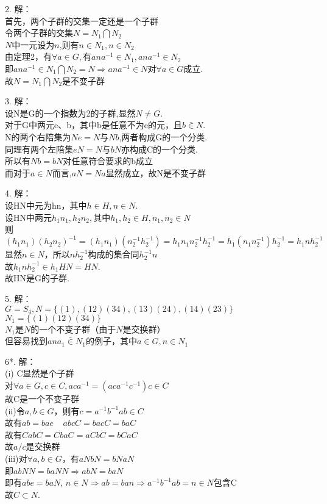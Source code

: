 \documentclass{ctexart}
\begin{document}
2.
解：\\
首先，两个子群的交集一定还是一个子群\\
令两个子群的交集$N=N_1 \bigcap N_2$\\
$N$中一元设为$n$,则有$n \in N_1, n \in N_2$\\
由定理2，有$\forall a \in G,$有$ana^{-1} \in N_1,ana^{-1} \in N_2$\\
即$ana^{-1} \in N_1 \bigcap N_2 = N \Rightarrow ana^{-1} \in N$对$\forall a \in G$成立.\\
故$N=N_1 \bigcap N_2$是不变子群

3.
解：\\
设N是G的一个指数为2的子群,显然$N \neq G.$\\
对于G中两元e、b，其中b是任意不为e的元，且$b \bar{\in} N.$\\
N的两个右陪集为$Ne=N$与$Nb$,两者构成G的一个分类.\\
同理有两个左陪集$eN=N$与$bN$亦构成C的一个分类.\\
所以有$Nb=bN$对任意符合要求的b成立\\
而对于$a\in N$而言,$aN=Na$显然成立，故N是不变子群

4.
解：\\
设HN中元为hn，其中$h \in H, n \in N$.\\
设HN中两元$h_1n_1,h_2n_2,$其中$h_1,h_2 \in H, n_1,n_2 \in N$\\
则$(h_1n_1)(h_2n_2)^{-1}=(h_1n_1)(n_2^{-1}h_2^{-1})=h_1n_1n_2^{-1}h_2^{-1}=h_1(n_1n_2^{-1})h_2^{-1}=h_1nh_2^{-1}$\\
显然$n \in N$，所以$nh_2^{-1}$构成的集合同$h_2^{-1}n$\\
故$h_1nh_2^{-1} \in h_1HN=HN$.\\
故HN是G的子群.

5.
解：\\
$G=S_4,N=\{(1),(12)(34),(13)(24),(14)(23)\}$\\
$N_1=\{(1)(12)(34)\}$\\
$N_1$是$N$的一个不变子群（由于$N$是交换群）\\
但容易找到$ana_1 \bar{\in} N_1$的例子，其中$a \in G, n \in N_1$

6*.
解：\\
(i) C显然是个子群\\
对$\forall a \in G,c \in C, aca^{-1}=(aca^{-1}c^{-1})c \in C$\\
故C是一个不变子群\\
(ii)令$a,b \in G$，则有$c=a^{-1}b^{-1}ab \in C$\\
故有$ab=bae \ \ \ \ \ abcC=bacC=baC$\\
故有$CabC = CbaC=aCbC=bCaC$\\
故$a/c$是交换群\\
(iii)对$\forall a,b \in G$，有$aNbN=bNaN$\\
即$abNN=baNN \Rightarrow abN=baN$\\
即有$abe=baN$, $n \in N \Rightarrow ab=ban \Rightarrow a^{-1}b^{-1}ab=n \in N$包含C\\
故$C \subset N$.
\end{document}
